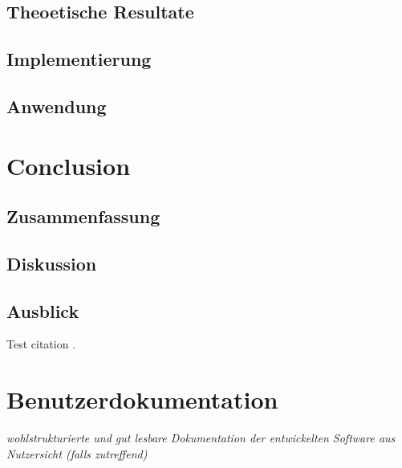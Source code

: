\documentclass{article}
\begin{document}
\subsection{Theoetische Resultate}
\label{sec:3.1}

\subsection{Implementierung}
\label{sec:3.2}

\subsection{Anwendung}
\label{sec:3.3}



\section{Conclusion}
\label{ch:4}

\subsection{Zusammenfassung}
\label{sec:4.1}

\subsection{Diskussion}
\label{sec:4.2}

\subsection{Ausblick}
\label{sec:4.3}

Test citation \cite{Ries1522Rad}.



\nocite{}


\newpage



\appendix

\section{Benutzerdokumentation}
\label{app1}

{\em wohlstrukturierte und gut lesbare Dokumentation der entwickelten Software aus Nutzersicht (falls zutreffend)}
\end{document}
